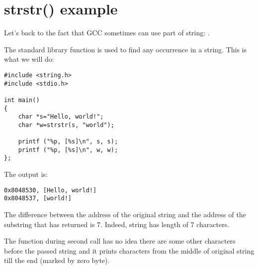 \section{strstr() example}
\label{strstr_example}

Let's back to the fact that GCC sometimes can use part of string: .

The  \CCpp standard library function is used to find any occurrence in a string.
This is what we will do:

\begin{lstlisting}[style=customc]
#include <string.h>
#include <stdio.h>

int main()
{
	char *s="Hello, world!";
	char *w=strstr(s, "world");

	printf ("%p, [%s]\n", s, s);
	printf ("%p, [%s]\n", w, w);
};
\end{lstlisting}

The output is:

\begin{lstlisting}
0x8048530, [Hello, world!]
0x8048537, [world!]
\end{lstlisting}

The difference between the address of the original string and the address of the substring that  has returned is 7.
Indeed,  string has length of 7 characters.

The \printf{} function during second call has no idea there are some other characters before
the passed string and it prints characters
from the middle of original string till the end (marked by zero byte).

